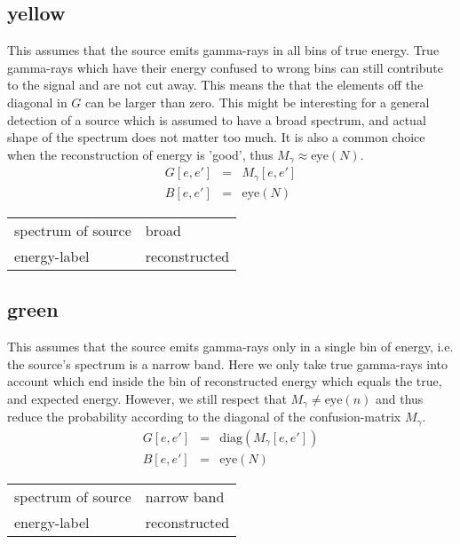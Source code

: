 \documentclass{article}%
\begin{document}
        \subsection{yellow}
            This assumes that the source emits gamma-rays in all bins of true energy.
            True gamma-rays which have their energy confused to wrong bins can still contribute to the signal and are not cut away.
            This means the that the elements off the diagonal in $G$ can be larger than zero.
            This might be interesting for a general detection of a source which is assumed to have a broad spectrum, and actual shape of the spectrum does not matter too much.
            It is also a common choice when the reconstruction of energy is 'good', thus $M_\gamma \approx \mathrm{eye}(N)$.
            \begin{eqnarray}
                G[e, e'] &=& M_{\gamma}[e, e']
                \\
                B[e, e'] &=& \mathrm{eye}(N)
            \end{eqnarray}
            \begin{center}
                \begin{tabular}{ll}
                    spectrum of source & broad\\
                    energy-label & reconstructed\\
                \end{tabular}
            \end{center}
        \subsection{green}
            This assumes that the source emits gamma-rays only in a single bin of energy, i.e. the source's spectrum is a narrow band.
            Here we only take true gamma-rays into account which end inside the bin of reconstructed energy which equals the true, and expected energy.
            However, we still respect that $M_{\gamma} \neq \mathrm{eye}(n)$ and thus reduce the probability according to the diagonal of the confusion-matrix $M_{\gamma}$.
            \begin{eqnarray}
                G[e, e'] &=& \mathrm{diag}(M_{\gamma}[e, e'])
                \\
                B[e, e'] &=& \mathrm{eye}(N)
            \end{eqnarray}
            \begin{center}
                \begin{tabular}{ll}
                    spectrum of source & narrow band\\
                    energy-label & reconstructed\\
                \end{tabular}
            \end{center}
\end{document}
